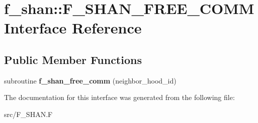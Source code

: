 \hypertarget{interfacef__shan_1_1F__SHAN__FREE__COMM}{}\section{f\+\_\+shan\+:\+:F\+\_\+\+S\+H\+A\+N\+\_\+\+F\+R\+E\+E\+\_\+\+C\+O\+MM Interface Reference}
\label{interfacef__shan_1_1F__SHAN__FREE__COMM}
\subsection*{Public Member Functions}
\begin{DoxyCompactItemize}
\item 
subroutine {\bfseries f\+\_\+shan\+\_\+free\+\_\+comm} (neighbor\+\_\+hood\+\_\+id)\hypertarget{interfacef__shan_1_1F__SHAN__FREE__COMM_a2862b578507bffbc706a0cb27e51c834}{}\label{interfacef__shan_1_1F__SHAN__FREE__COMM_a2862b578507bffbc706a0cb27e51c834}

\end{DoxyCompactItemize}


The documentation for this interface was generated from the following file\+:\begin{DoxyCompactItemize}
\item 
src/F\+\_\+\+S\+H\+A\+N.\+F\end{DoxyCompactItemize}
